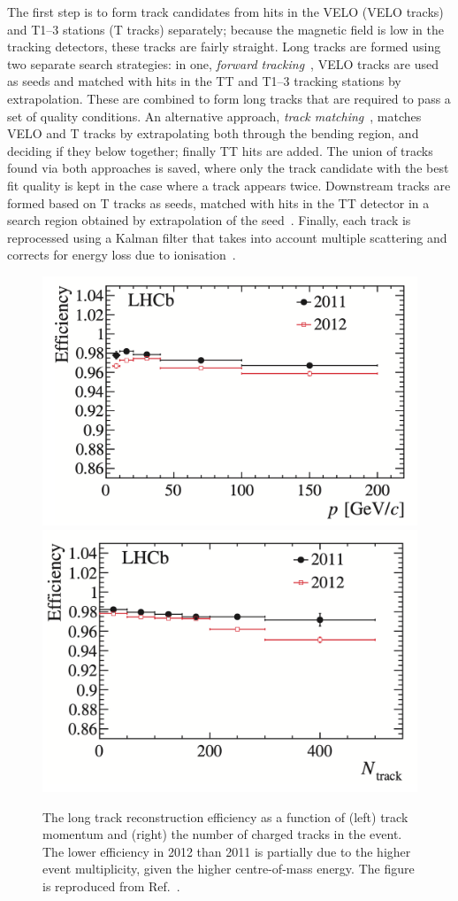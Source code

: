 The first step is to form track candidates from hits in the VELO (VELO tracks) and T1--3 stations (T tracks) separately; because the magnetic field is low in the tracking detectors, these tracks are fairly straight. Long tracks are formed using two separate search strategies: in one, \emph{forward tracking}~\cite{VELO-Forward}, VELO tracks are used as seeds and matched with hits in the TT and T1--3 tracking stations by extrapolation. These are combined to form long tracks that are required to pass a set of quality conditions. An alternative approach, \emph{track matching}~\cite{VELO-Match,VELO-Match2}, matches VELO and T tracks by extrapolating both through the bending region, and deciding if they below together; finally TT hits are added. The union of tracks found via both approaches is saved, where only the track candidate with the best fit quality is kept in the case where a track appears twice. Downstream tracks are formed based on T tracks as seeds, matched with hits in the TT detector in a search region obtained by extrapolation of the seed~\cite{Downstream}. Finally, each track is reprocessed using a Kalman filter that takes into account multiple scattering and corrects for energy loss due to ionisation~\cite{fruhwirthApplicationKalmanFiltering1987,VanTilburg:885750}.

\begin{figure}[tb]
    \centering
    \includegraphics[width=0.45\columnwidth]{figures/detector/track_eff_p.png}
    \includegraphics[width=0.45\columnwidth]{figures/detector/track_eff_N.png}
    \caption{The long track reconstruction efficiency as a function of (left) track momentum and (right) the number of charged tracks in the event. The lower efficiency in 2012 than 2011 is partially due to the higher event multiplicity, given the higher centre-of-mass energy. The figure is reproduced from Ref.~\cite{LHCb-Performance}.}
    \label{fig:track_eff}
\end{figure}

